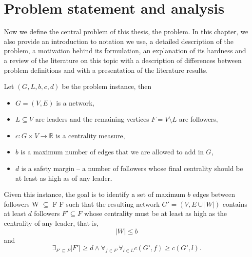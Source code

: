 \chapter{Problem statement and analysis}\label{chapter:ProblemStatement}

Now we define the central problem of this thesis, the \HL problem.
In this chapter, we also provide an introduction to notation we use,
a detailed description of the problem, a motivation behind its formulation, an explanation of its hardness
and a review of the literature on this topic with a description of differences between problem definitions
and with a presentation of the literature results.


\vspace{2.5mm}
\begin{tcolorbox}[
    enhanced, skin=enhancedmiddle,
    arc=0pt, outer arc=0pt,
    frame hidden, %
    colback=backgroundgray!10,
    boxsep=0mm,
    borderline={0.75mm}{0mm}{decoration}, borderline={0.75mm}{0.75mm}{backgroundgray},
]
\begin{definition}[\HL]\label{def:HL}
    Let $(G, L, b, c, d)$ be the problem instance, then
    \begin{itemize}
        \item $G = (V, E)$ is a network,
        \item $L \subseteq V$ are leaders and the remaining vertices $F = V \setminus L$ are followers,
        \item $c : G \times V \rightarrow \mathbb{R}$ is a centrality measure,
        \item $b$ is a maximum number of edges that we are allowed to add in $G$,
        \item $d$ is a safety margin -- a number of followers whose final centrality should be at least as high as of any leader.
    \end{itemize}
    Given this instance, the goal is to identify a set of maximum $b$ edges between followers W $\subseteq$ F {\texttimes} F
    such that the resulting network $G' = (V, E \cup |W|)$ contains at least $d$ followers $F' \subseteq F$
    whose centrality must be at least as high as the centrality of any leader, that is,
    $$|W| \leq b$$
    and
    $$\exists_{F' \subseteq F} |F'| \geq d \wedge \forall_{f \in F'} \forall_{l \in L} c(G', f) \geq c(G', l).$$
\end{definition}
\end{tcolorbox}
\vspace{2.5mm}

